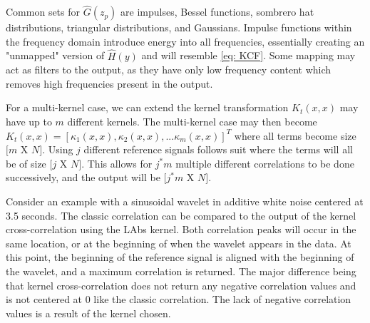     Common sets for $\hat{G}(z_p)$ are impulses, Bessel functions, sombrero hat distributions, triangular distributions, and Gaussians. Impulse functions within the frequency domain introduce energy into all frequencies, essentially creating an "unmapped" version of $\hat{H}(y)$ and will resemble \ref*{eq: KCF}. Some mapping may act as filters to the output, as they have only low frequency content which removes high frequencies present in the output. 

    For a multi-kernel case, we can extend the kernel transformation $K_t(x,x)$ may have up to $m$ different kernels. The multi-kernel case may then become $K_t(x,x) = [\kappa_1(x,x), \kappa_2(x,x), ... \kappa_m(x,x)]^T$ where all terms become size $[m$ X $N]$. Using $j$ different reference signals follows suit where the terms will all be of size $[j$ X $N]$. This allows for $j^*m$ multiple different correlations to be done successively, and the output will be $[j^*m$ X $N]$.

    Consider an example with a sinusoidal wavelet in additive white noise centered at 3.5 seconds. The classic correlation can be compared to the output of the kernel cross-correlation using the LAbs kernel. Both correlation peaks will occur in the same location, or at the beginning of when the wavelet appears in the data. At this point, the beginning of the reference signal is aligned with the beginning of the wavelet, and a maximum correlation is returned. The major difference being that kernel cross-correlation does not return any negative correlation values and is not centered at 0 like the classic correlation. The lack of negative correlation values is a result of the kernel chosen.

